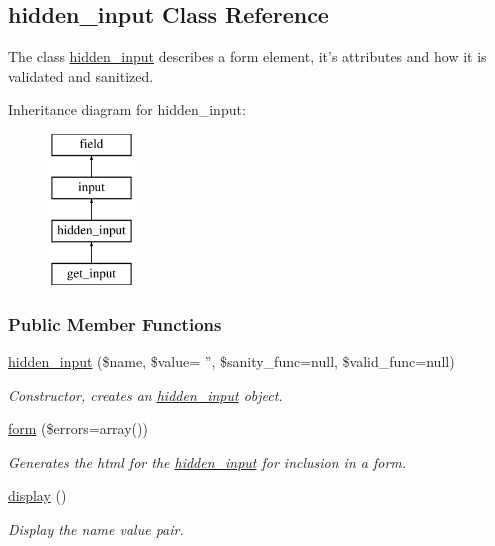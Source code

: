 \hypertarget{classhidden__input}{\subsection{hidden\-\_\-input Class Reference}
\label{classhidden__input}
}


The class \hyperlink{classhidden__input}{hidden\-\_\-input} describes a form element, it's attributes and how it is validated and sanitized.  


Inheritance diagram for hidden\-\_\-input\-:\begin{figure}[H]
\begin{center}
\leavevmode
\includegraphics[height=4.000000cm]{classhidden__input}
\end{center}
\end{figure}
\subsubsection*{Public Member Functions}
\begin{DoxyCompactItemize}
\item 
\hyperlink{classhidden__input_a2aeaf443be73e4259caf9dd2cfdecddf}{hidden\-\_\-input} (\$name, \$value= '', \$sanity\-\_\-func=null, \$valid\-\_\-func=null)
\begin{DoxyCompactList}\small\item\em Constructor, creates an \hyperlink{classhidden__input}{hidden\-\_\-input} object. \end{DoxyCompactList}\item 
\hyperlink{classhidden__input_ab20546aae2284c4b1475854d0326e2e3}{form} (\$errors=array())
\begin{DoxyCompactList}\small\item\em Generates the html for the \hyperlink{classhidden__input}{hidden\-\_\-input} for inclusion in a form. \end{DoxyCompactList}\item 
\hyperlink{classhidden__input_a069e47104ea4bd965718c114013fa96f}{display} ()
\begin{DoxyCompactList}\small\item\em Display the name value pair. \end{DoxyCompactList}\end{DoxyCompactItemize}
